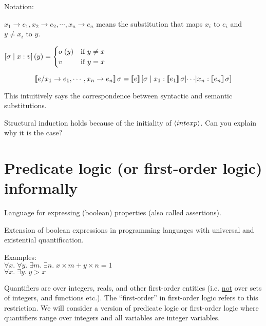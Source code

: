 \begin{enumcirc}
	Notation:
	\begin{enumrm}
		\item
		$x_1 \rightarrow e_1, x_2 \rightarrow e_2, \cdots , x_n \rightarrow e_n$
		means the substitution that maps $x_i$ to $e_i$ and $y \ne x_i$ to $y$.
		\item
		$
			\left[ \sigma \; \middle\vert \; x:v \right]\left( y \right) =
			\begin{cases}
				\sigma\left( y \right) & \textrm{if } y \ne x \\
				v               & \textrm{if } y = x
			\end{cases}
		$
	\end{enumrm}

	\begin{corollary}
		\[
			\left\llbracket e / x_1 \rightarrow e_1, \cdots , x_n \rightarrow e_n \right\rrbracket\sigma =
			\left\llbracket e \right\rrbracket \left[ \sigma \; \middle\vert \; x_1 : \left\llbracket e_1 \right\rrbracket \sigma \middle\vert \cdots \middle\vert x_n : \left\llbracket e_n \right\rrbracket\sigma \right]
		\]
	\end{corollary}
	This intuitively says the correspondence between syntactic and semantic
	substitutions.
	\item
	Structural induction holds because of the initiality of $\left\langle intexp \right\rangle$.
	Can you explain why it is the case?
\end{enumcirc}

\section{Predicate logic (or first-order logic) informally}

\begin{enumcirc}
	\item
	Language for expressing (boolean) properties (also called assertions).
	\item
	Extension of boolean expressions in programming languages with universal and
	existential quantification.
	\item
	Examples:\\
	$ \forall x .\; \forall y .\; \exists m .\; \exists n .\; x \times m + y \times n = 1 $ \\
	$ \forall x .\; \exists y .\; y > x$
	\item
	Quantifiers are over integers, reals, and other first-order entities (i.e.
	\underline{not} over sets of integers, and functions etc.).
	The ``first-order'' in first-order logic refers to this restriction.
	We will consider a version of predicate logic or first-order logic where
	quantifiers range over integers and all variables are integer variables.

\end{enumcirc}

